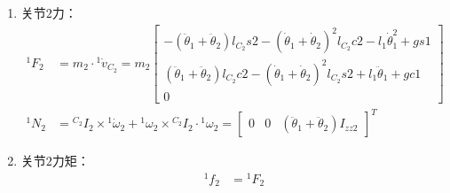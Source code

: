 \documentclass[
12pt, %
a4paper, 
oneside, %
]{scrartcl}
\begin{document}
{\begin{enumerate}
\begin{align*}
{}^1 \dot{\omega}_2 &= {}^1 \dot{\omega}_1 + \ddot{\theta}_2 \cdot {}^1 Z_2 = \begin{bmatrix} 0 & 0 & \ddot{\theta}_1  + \ddot{\theta}_2 \end{bmatrix}^T \\
{}^1 \dot{v}_2 &= {}^1 \dot{v}_1 + {}^1 \dot{\omega}_1 \times {}^1 P_2 + {}^1 \omega_1 \times ({}^1 \omega_1 \times {}^1 P_2) = \begin{bmatrix} - l_1 \dot{\theta}_1^2 + gs1 & l_1 \ddot{\theta}_1 + gc1 & 0 \end{bmatrix}^T \\
{}^1 P_{C_2} &= \begin{bmatrix} l_{C_2}c2 & l_{C_2}s2 & 0\end{bmatrix}^T \\
{}^1 \dot{v}_{C_2} &= {}^1 \dot{v}_2 + {}^1 \dot{\omega}_2 \times {}^1 P_{C_2} + {}^1 \omega_2 \times ({}^1 \omega_2 \times {}^1 P_{C_2}) \\
&= \begin{bmatrix} -(\ddot{\theta}_1 + \ddot{\theta}_2)l_{C_2}s2 - (\dot{\theta}_1 + \dot{\theta}_2)^2 l_{C_2}c2 - l_1 \dot{\theta}_1^2 + gs1 \\ (\ddot{\theta}_1 + \ddot{\theta}_2)l_{C_2}c2 - (\dot{\theta}_1 + \dot{\theta}_2)^2 l_{C_2}s2 + l_1 \ddot{\theta}_1 + gc1 \\ 0 \end{bmatrix}
\end{align*}
\item 关节$ 2 $力：
\begin{align*}
{}^1 F_2 &= m_2 \cdot {}^1 \dot{v}_{C_2} = m_2 \begin{bmatrix} -(\ddot{\theta}_1 + \ddot{\theta}_2)l_{C_2}s2 - (\dot{\theta}_1 + \dot{\theta}_2)^2 l_{C_2}c2 - l_1 \dot{\theta}_1^2 + gs1 \\ (\ddot{\theta}_1 + \ddot{\theta}_2)l_{C_2}c2 - (\dot{\theta}_1 + \dot{\theta}_2)^2 l_{C_2}s2 + l_1 \ddot{\theta}_1 + gc1 \\ 0 \end{bmatrix} \\
{}^1 N_2 &= {}^{C_2}I_2 \times {}^1 \dot{\omega}_2 + {}^1 \omega_2 \times {}^{C_2}I_2 \cdot {}^1 \omega_2 = \begin{bmatrix} 0 & 0 & (\ddot{\theta}_1 + \ddot{\theta}_2) I_{zz2} \end{bmatrix}^T
\end{align*}
\item 关节$ 2 $力矩：
\begin{align*}
{}^1 f_2 &= {}^1 F_2 \\

\end{align*}
\end{enumerate}}
\end{document}
